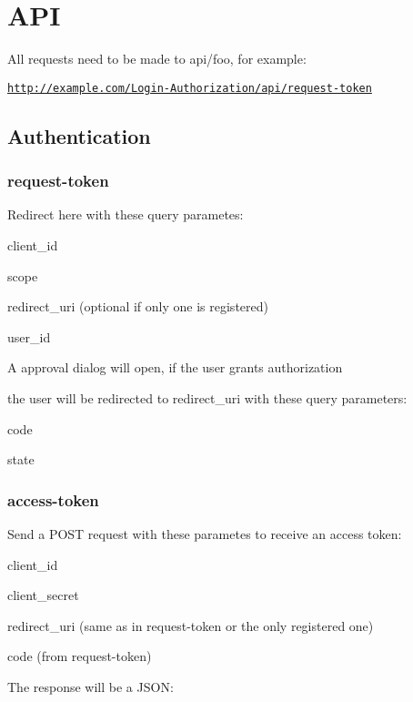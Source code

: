 \hypertarget{api_sec_api}{}\section{\-A\-P\-I}\label{api_sec_api}
\-All requests need to be made to api/foo, for example\-: \par
 \href{http://example.com/Login-Authorization/api/request-token}{\tt http\-://example.\-com/\-Login-\/\-Authorization/api/request-\/token}\hypertarget{api_sub1}{}\subsection{\-Authentication}\label{api_sub1}
\hypertarget{api_subsub1}{}\subsubsection{request-\/token}\label{api_subsub1}
\-Redirect here with these query parametes\-:
\begin{DoxyItemize}
\item client\-\_\-id
\item scope
\item redirect\-\_\-uri (optional if only one is registered)
\item user\-\_\-id
\end{DoxyItemize}\-A approval dialog will open, if the user grants authorization \par
 the user will be redirected to redirect\-\_\-uri with these query parameters\-:
\begin{DoxyItemize}
\item code
\item state
\end{DoxyItemize} 
\vspace{10cm}
\pagebreak
\hypertarget{api_subsub2}{}\subsubsection{access-\/token}\label{api_subsub2}
\-Send a \-P\-O\-S\-T request with these parametes to receive an access token\-:
\begin{DoxyItemize}
\item client\-\_\-id
\item client\-\_\-secret
\item redirect\-\_\-uri (same as in request-\/token or the only registered one)
\item code (from request-\/token)
\end{DoxyItemize}\-The response will be a \-J\-S\-O\-N\-:\par
